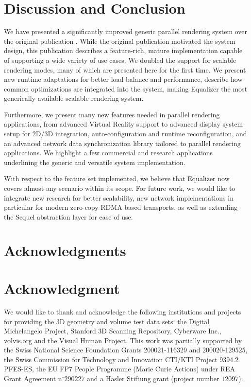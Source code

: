 \documentclass[10pt,journal,compsoc]{IEEEtran}
\begin{document}
\section{Discussion and Conclusion}
\label{sec:conclusions}

We have presented a significantly improved generic parallel rendering system
over the original publication \cite{EMP:09}. While the original publication
motivated the system design, this publication describes a feature-rich, mature
implementation capable of supporting a wide variety of use cases. We doubled the
support for scalable rendering modes, many of which are presented here for the
first time. We present new runtime adaptations for better load balance and
performance, describe how common optimizations are integrated into the system,
making Equalizer the most generically available scalable rendering system.

Furthermore, we present many new features needed in parallel rendering
applications, from advanced Virtual Reality support to advanced display system
setup for 2D/3D integration, auto-configuration and runtime reconfiguration, and
an advanced network data synchronization library tailored to parallel rendering
applications. We highlight a few commercial and research applications
underlining the generic and versatile system implementation.

With respect to the feature set implemented, we believe that Equalizer now
covers almost any scenario within its scope. For future work, we would like to
integrate new research for better scalability, new network implementations in
particular for modern zero-copy RDMA based transports, as well as extending the
Sequel abstraction layer for ease of use.

\appendices
\ifCLASSOPTIONcompsoc
  \section*{Acknowledgments}
\else
  \section*{Acknowledgment}
\fi
We would like to thank and acknowledge the following institutions and projects
for providing the 3D geometry and volume test data sets: the Digital
Michelangelo Project, Stanford 3D Scanning Repository, Cyberware Inc.,
volvis.org and the Visual Human Project.
%
This work was partially supported by the Swiss National Science Foundation
Grants 200021-116329 and 200020-129525, the Swiss Commission for Technology and
Innovation CTI/KTI Project 9394.2 PFES-ES, the EU FP7 People Programme (Marie
Curie Actions) under REA Grant Agreement n$^{\circ}290227$ and a Hasler Stiftung
grant (project number $12097$).
\end{document}
